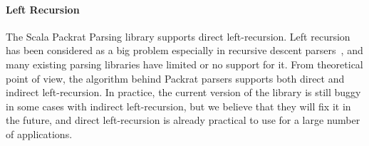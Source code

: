 \paragraph{Left Recursion} The Scala Packrat Parsing library
supports direct left-recursion. Left recursion has been considered
as a big problem especially in recursive descent parsers~\cite{}, and many
existing parsing libraries have limited or no support for it. From theoretical point of
view, the algorithm behind Packrat parsers supports both direct and
indirect left-recursion. In practice, the current version of the library is still
buggy in some cases with indirect left-recursion, but we believe that
they will fix it in the future, and direct left-recursion is
already practical to use for a large number of applications.
